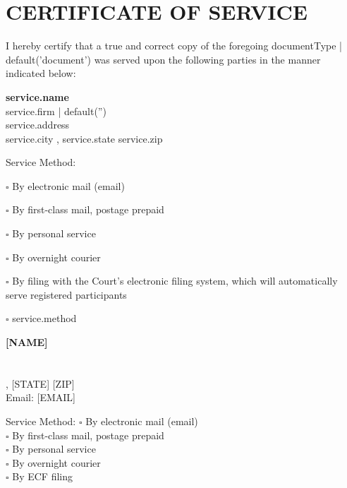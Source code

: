 
\section*{CERTIFICATE OF SERVICE}

I hereby certify that a true and correct copy of the foregoing {{ documentType | default('document') }} was served upon the following parties in the manner indicated below:

\vspace{0.25in}

{%
{%
\textbf{{{ service.name }}}\\
{{ service.firm | default('') }}\\
{{ service.address }}\\
{{ service.city }}, {{ service.state }} {{ service.zip }}\\
{%

Service Method: 
{%
$\square$ By electronic mail (email)
{%
$\square$ By first-class mail, postage prepaid
{%
$\square$ By personal service
{%
$\square$ By overnight courier
{%
$\square$ By filing with the Court's electronic filing system, which will automatically serve registered participants
{%
$\square$ {{ service.method }}
{%

\vspace{0.25in}

{%
{%
\textbf{[NAME]}\\
[FIRM]\\
[ADDRESS]\\
[CITY], [STATE] [ZIP]\\
Email: [EMAIL]

Service Method: $\square$ By electronic mail (email)\\
\phantom{Service Method: } $\square$ By first-class mail, postage prepaid\\
\phantom{Service Method: } $\square$ By personal service\\
\phantom{Service Method: } $\square$ By overnight courier\\
\phantom{Service Method: } $\square$ By ECF filing
{%

}}}}}}}}}}}}}
